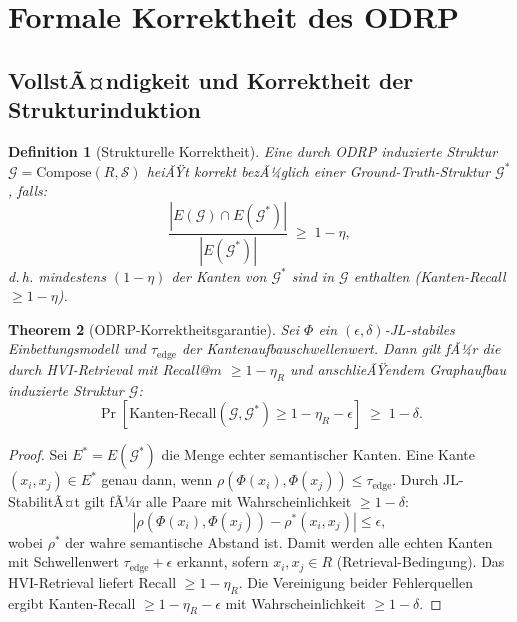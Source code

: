 ﻿\documentclass[12pt,a4paper]{article}
\newtheorem{theorem}{Theorem}[section]
\newtheorem{definition}[theorem]{Definition}
\begin{document}
\section{Formale Korrektheit des ODRP}
\label{sec:korrektheit}

\subsection{VollstÃ¤ndigkeit und Korrektheit der Strukturinduktion}

\begin{definition}[Strukturelle Korrektheit]
\label{def:korrektheit}
Eine durch ODRP induzierte Struktur $\mathcal{G} = \text{Compose}(R, \mathcal{S})$
heiÃŸt \emph{korrekt} bezÃ¼glich einer Ground-Truth-Struktur
$\mathcal{G}^*$, falls:
\[
  \frac{|E(\mathcal{G}) \cap E(\mathcal{G}^*)|}
       {|E(\mathcal{G}^*)|} \;\geq\; 1 - \eta,
\]
d.\,h. mindestens $(1-\eta)$ der Kanten von $\mathcal{G}^*$
sind in $\mathcal{G}$ enthalten (Kanten-Recall $\geq 1-\eta$).
\end{definition}

\begin{theorem}[ODRP-Korrektheitsgarantie]
\label{thm:correctness}
Sei $\Phi$ ein $(\epsilon, \delta)$-JL-stabiles Einbettungsmo\-dell
und $\tau_{\text{edge}}$ der Kantenaufbauschwellenwert. Dann gilt
fÃ¼r die durch HVI-Retrieval mit Recall@$m$ $\geq 1-\eta_R$ und
anschlieÃŸendem Graphaufbau induzierte Struktur $\mathcal{G}$:
\[
  \Pr\!\left[\text{Kanten-Recall}(\mathcal{G}, \mathcal{G}^*)
  \geq 1 - \eta_R - \epsilon\right] \;\geq\; 1 - \delta.
\]
\end{theorem}

\begin{proof}
Sei $E^* = E(\mathcal{G}^*)$ die Menge echter semantischer Kanten.
Eine Kante $(x_i, x_j) \in E^*$ genau dann, wenn
$\rho(\Phi(x_i), \Phi(x_j)) \leq \tau_{\text{edge}}$.
Durch JL-StabilitÃ¤t gilt fÃ¼r alle Paare mit Wahrscheinlichkeit
$\geq 1-\delta$:
\[
  \left|\rho(\Phi(x_i),\Phi(x_j)) - \rho^*(x_i, x_j)\right| \leq \epsilon,
\]
wobei $\rho^*$ der wahre semantische Abstand ist. Damit werden
alle echten Kanten mit Schwellenwert $\tau_{\text{edge}}+\epsilon$
erkannt, sofern $x_i, x_j \in R$ (Retrieval-Bedingung). Das
HVI-Retrieval liefert Recall $\geq 1-\eta_R$. Die Vereinigung beider
Fehlerquellen ergibt Kanten-Recall $\geq 1 - \eta_R - \epsilon$
mit Wahrscheinlichkeit $\geq 1-\delta$.
\end{proof}
\end{document}
